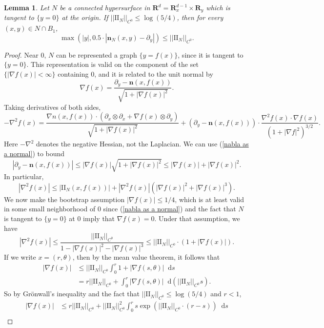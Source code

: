 \documentclass[reqno,11pt]{amsart}
\newcommand{\RR}{\mathbf{R}}
\newcommand*\dif{\mathop{}\!\mathrm{d}}
\newcommand{\Two}{\mathrm{I\!I}}
\newcommand{\normal}{\mathbf n}
\newtheorem{lemma}[theorem]{Lemma}
\theoremstyle{definition}
\numberwithin{equation}{section}
\begin{document}
\begin{lemma}\label{existence of tubes}
	Let $N$ be a connected hypersurface in $\RR^d = \RR^{d - 1}_x \times \RR_y$ which is tangent to $\{y = 0\}$ at the origin.
	If $||\Two_N||_{C^0} \leq \log(5/4)$, then for every $(x, y) \in N \cap B_1$,
	$$\max(|y|, 0.5 \cdot |\normal_N(x, y) - \partial_y|) \leq ||\Two_N||_{C^0}.$$
\end{lemma}
\begin{proof}
	Near $0$, $N$ can be represented a graph $\{y = f(x)\}$, since it is tangent to $\{y = 0\}$.
	This representation is valid on the component of the set $\{|\nabla f(x)| < \infty\}$ containing $0$, and it is related to the unit normal by 
\begin{equation}\label{nabla as a normal}
	\nabla f(x) = \frac{\partial_y - \normal(x, f(x))}{\sqrt{1 + |\nabla f(x)|^2}}.
\end{equation}
	Taking derivatives of both sides,
	$$-\nabla^2 f(x) = \frac{\nabla n(x, f(x)) \cdot (\partial_x \otimes \partial_x + \nabla f(x) \otimes \partial_y)}{\sqrt{1 + |\nabla f(x)|^2}} + (\partial_y - \normal(x, f(x))) \cdot \frac{\nabla^2 f(x) \cdot \nabla f(x)}{(1 + |\nabla f|^2)^{3/2}}.$$
	Here $-\nabla^2$ denotes the negative Hessian, not the Laplacian. 
	We can use (\ref{nabla as a normal}) to bound 
	$$|\partial_y - \normal(x, f(x))| \leq |\nabla f(x)|\sqrt{1 + |\nabla f(x)|^2} \leq |\nabla f(x)| + |\nabla f(x)|^2.$$
	In particular,
	$$|\nabla^2 f(x)| \leq |\Two_N(x, f(x))| + |\nabla^2 f(x)| (|\nabla f(x)|^2 + |\nabla f(x)|^3).$$
	We now make the bootstrap assumption $|\nabla f(x)| \leq 1/4$, which is at least valid in some small neighborhood of $0$ since (\ref{nabla as a normal}) and the fact that $N$ is tangent to $\{y = 0\}$ at $0$ imply that $\nabla f(x) = 0$. Under that assumption, we have
	$$|\nabla^2 f(x)| \leq \frac{||\Two_N||_{C^0}}{1 - |\nabla f(x)|^2 - |\nabla f(x)|^3} \leq ||\Two_N||_{C^0} \cdot (1 + |\nabla f(x)|).$$
	If we write $x = (r, \theta)$, then by the mean value theorem, it follows that 
\begin{align*}
	|\nabla f(x)| &\leq ||\Two_N||_{C^0} \int_0^r 1 + |\nabla f(s, \theta)| \dif s \\
	&= r||\Two_N||_{C^0} + \int_0^r |\nabla f(s, \theta)| \dif(||\Two_N||_{C^0} s).
\end{align*}
	So by Gr\"onwall's inequality and the fact that $||\Two_N||_{C^0} \leq \log(5/4)$ and $r < 1$,
\begin{align*}
	|\nabla f(x)| &\leq r ||\Two_N||_{C^0} + ||\Two_N||_{C^0}^2 \int_0^r s \exp(||\Two_N||_{C^0} \cdot (r - s)) \dif s \\

\end{align*}
\end{proof}
\end{document}
